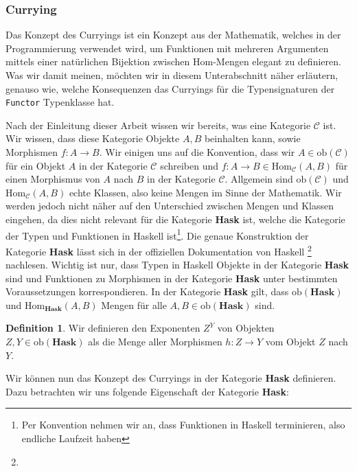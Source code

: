 \documentclass{hhuarticle}
\theoremstyle{definition}
\newtheorem{definition}{Definition}[section]
\theoremstyle{theorem}
\begin{document}
  \subsubsection{Currying}

  Das Konzept des Curryings ist ein Konzept aus der Mathematik, welches
  in der Programmierung verwendet wird, um Funktionen mit mehreren
  Argumenten mittels einer natürlichen Bijektion zwischen $\text{Hom}$-Mengen
  elegant zu definieren. Was wir damit meinen, möchten wir in diesem
  Unterabschnitt näher erläutern, genauso wie, welche Konsequenzen
  das Curryings für die Typensignaturen der \verb|Functor| Typenklasse
  hat.

  Nach der Einleitung dieser Arbeit wissen wir bereits, was eine
  Kategorie $\mathcal{C}$ ist. Wir wissen, dass diese Kategorie
  Objekte $A, B$ beinhalten kann, sowie Morphismen $f:A\rightarrow B$.
  Wir einigen uns auf die Konvention, dass wir $A\in \text{ob}(\mathcal{C})$
  für ein Objekt $A$ in der Kategorie $\mathcal{C}$ schreiben und
  $f:A\rightarrow B \in \text{Hom}_\mathcal{C}(A, B)$ für
  einen Morphismus von $A$ nach $B$ in der Kategorie $\mathcal{C}$.
  Allgemein sind $\text{ob}(\mathcal{C})$ und $\text{Hom}_\mathcal{C}(A, B)$
  echte Klassen, also keine Mengen im Sinne der Mathematik.
  Wir werden jedoch nicht näher auf den Unterschied zwischen
  Mengen und Klassen eingehen, da dies nicht relevant für die
  Kategorie \textbf{Hask} ist, welche die Kategorie der Typen und 
  Funktionen in Haskell ist\footnote{Per Konvention nehmen wir an,
  dass Funktionen in Haskell terminieren, also endliche Laufzeit haben}.
  Die genaue Konstruktion der Kategorie \textbf{Hask}
  lässt sich in der offiziellen Dokumentation von Haskell
  \footnote{}
  nachlesen. Wichtig ist nur, dass Typen in Haskell Objekte in der
  Kategorie \textbf{Hask} sind und Funktionen zu Morphismen in der
  Kategorie \textbf{Hask} unter bestimmten Voraussetzungen korrespondieren.
  In der Kategorie \textbf{Hask} gilt, dass $\text{ob}(\textbf{Hask})$
  und $\text{Hom}_\textbf{Hask}(A, B)$ Mengen für alle $A, B \in \text{ob}(\textbf{Hask})$ sind.

  \begin{definition}
    Wir definieren den Exponenten $Z^Y$ von Objekten $Z, Y\in \text{ob}(\textbf{Hask})$
    als die Menge aller Morphismen $h: Z \to Y$ vom Objekt $Z$ nach $Y$.
  \end{definition}

  Wir können nun das Konzept des Curryings in der Kategorie \textbf{Hask}
  definieren. Dazu betrachten wir uns folgende Eigenschaft der Kategorie
  \textbf{Hask}:
\end{document}
